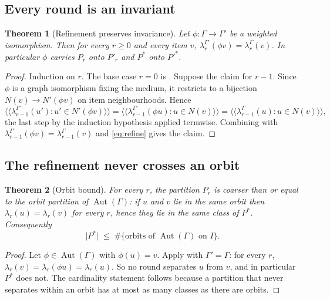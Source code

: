\documentclass[11pt,twocolumn,a4paper]{article}
\theoremstyle{crthm}
\newtheorem{theorem}{Theorem}[section]
\theoremstyle{definition}
\theoremstyle{remark}
\newcommand{\Gph}{\Gamma}
\newcommand{\abs}[1]{\lvert#1\rvert}
\newcommand{\Aut}{\operatorname{Aut}}
\begin{document}
\subsection{Every round is an invariant}

\begin{theorem}[Refinement preserves invariance]
\label{thm:refine-invariant}
Let $\phi\colon\Gph\to\Gph'$ be a weighted isomorphism. Then for every
$r\ge0$ and every item $v$, $\lambda_r^{\Gph'}(\phi v)=\lambda_r^{\Gph}(v)$.
In particular $\phi$ carries $P_r$ onto $P'_r$ and $P^{*}$ onto $P'^{*}$.
\end{theorem}

\begin{proof}
Induction on $r$. The base case $r=0$ is . Suppose
the claim for $r-1$. Since $\phi$ is a graph isomorphism fixing the
medium, it restricts to a bijection $N(v)\to N'(\phi v)$ on item
neighbourhoods. Hence
\[
\langle\!\langle \lambda_{r-1}^{\Gph'}(u') : u'\in N'(\phi v)\rangle\!\rangle
=\langle\!\langle \lambda_{r-1}^{\Gph'}(\phi u) : u\in N(v)\rangle\!\rangle
=\langle\!\langle \lambda_{r-1}^{\Gph}(u) : u\in N(v)\rangle\!\rangle,
\]
the last step by the induction hypothesis applied termwise. Combining with
$\lambda_{r-1}^{\Gph'}(\phi v)=\lambda_{r-1}^{\Gph}(v)$ and
\eqref{eq:refine} gives the claim.
\end{proof}

\subsection{The refinement never crosses an orbit}

\begin{theorem}[Orbit bound]
\label{thm:orbit-bound}
For every $r$, the partition $P_r$ is coarser than or equal to the orbit
partition of $\Aut(\Gph)$: if $u$ and $v$ lie in the same orbit then
$\lambda_r(u)=\lambda_r(v)$ for every $r$, hence they lie in the same
class of $P^{*}$. Consequently
\[
\abs{P^{*}}\;\le\;\#\{\text{orbits of }\Aut(\Gph)\text{ on } I\}.
\]
\end{theorem}

\begin{proof}
Let $\phi\in\Aut(\Gph)$ with $\phi(u)=v$. Apply
 with $\Gph'=\Gph$: for every $r$,
$\lambda_r(v)=\lambda_r(\phi u)=\lambda_r(u)$. So no round separates $u$
from $v$, and in particular $P^{*}$ does not. The cardinality statement
follows because a partition that never separates within an orbit has at
most as many classes as there are orbits.
\end{proof}
\end{document}
